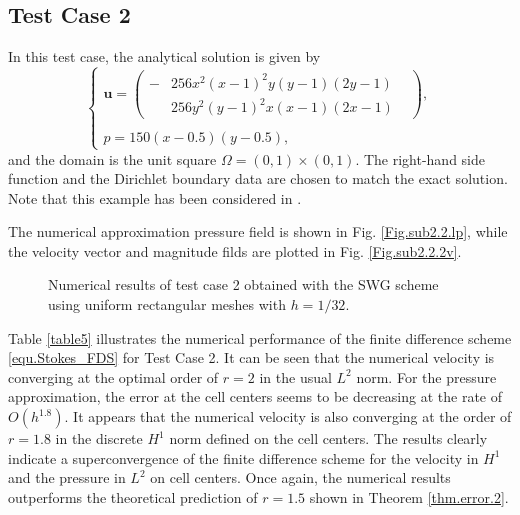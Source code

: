 \documentclass[final,leqno]{siamltex704}
\begin{document}
\subsection{Test Case 2} In this test case, the analytical solution is given by
\begin{equation*}
\left \{
\begin{array}{lll}
\bm{u} =\left(
\begin{array}{lll}
-&256x^2(x-1)^2y(y-1)(2y-1)&\\
 &256y^2(y-1)^2x(x-1)(2x-1)&
\end{array}
\right),\\
~\\
p= 150(x-0.5)(y-0.5),
\end{array}\right.
\end{equation*}
and the domain is the unit square $\Omega=(0,1)\times(0,1)$.
The right-hand side function and the Dirichlet boundary data are chosen to match the exact solution. Note that this example has been considered in \cite{LS-JSC-2015}.

The numerical approximation pressure field is shown in Fig. \ref{Fig.sub2.2.lp}, while the velocity vector and magnitude filds are plotted in Fig. \ref{Fig.sub2.2.2v}.
\begin{figure}[H]
\centering
{}

\caption{Numerical results of test case 2 obtained with the SWG scheme using uniform rectangular meshes with $h=1/32$.}
\label{fig:testcase2}
\end{figure}

Table \ref{table5} illustrates the numerical performance of the finite difference scheme \eqref{equ.Stokes_FDS} for Test Case 2. It can be seen that the numerical velocity is converging at the optimal order of $r=2$ in the usual $L^2$ norm. For the pressure approximation, the error at the cell centers seems to be decreasing  at the rate of $O(h^{1.8})$. It appears that the numerical velocity is also converging at the order of $r=1.8$ in the discrete $H^1$ norm defined on the cell centers. The results clearly indicate a superconvergence of the finite difference scheme for the velocity in $H^1$ and the pressure in $L^2$ on cell centers. Once again, the numerical results outperforms the theoretical prediction of $r=1.5$ shown in Theorem \ref{thm.error.2}.
\end{document}
